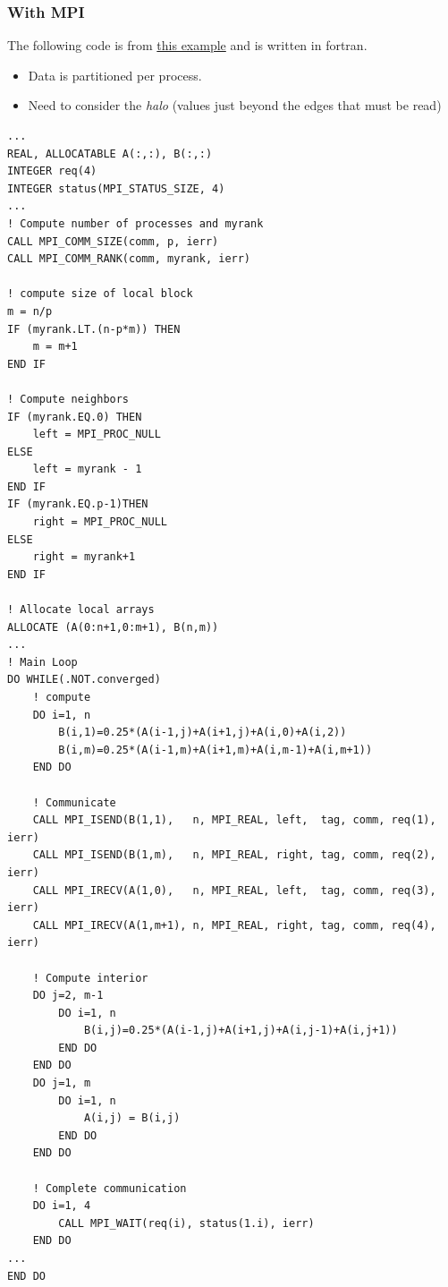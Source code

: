 \subsubsection{With MPI}
The following code is from \href{https://netlib.org/utk/papers/mpi-book/node51.html}{this example} and is written in fortran.
\begin{itemize}
    \item Data is partitioned per process.
    \item Need to consider the \textit{halo} (values just beyond the edges that must be read)
\end{itemize}
\begin{verbatim}
...
REAL, ALLOCATABLE A(:,:), B(:,:)
INTEGER req(4)
INTEGER status(MPI_STATUS_SIZE, 4)
...
! Compute number of processes and myrank
CALL MPI_COMM_SIZE(comm, p, ierr)
CALL MPI_COMM_RANK(comm, myrank, ierr)

! compute size of local block
m = n/p
IF (myrank.LT.(n-p*m)) THEN
    m = m+1
END IF

! Compute neighbors
IF (myrank.EQ.0) THEN
    left = MPI_PROC_NULL
ELSE
    left = myrank - 1
END IF
IF (myrank.EQ.p-1)THEN
    right = MPI_PROC_NULL
ELSE
    right = myrank+1
END IF

! Allocate local arrays
ALLOCATE (A(0:n+1,0:m+1), B(n,m))
...
! Main Loop
DO WHILE(.NOT.converged)
    ! compute
    DO i=1, n
        B(i,1)=0.25*(A(i-1,j)+A(i+1,j)+A(i,0)+A(i,2))
        B(i,m)=0.25*(A(i-1,m)+A(i+1,m)+A(i,m-1)+A(i,m+1))
    END DO

    ! Communicate
    CALL MPI_ISEND(B(1,1),   n, MPI_REAL, left,  tag, comm, req(1), ierr)
    CALL MPI_ISEND(B(1,m),   n, MPI_REAL, right, tag, comm, req(2), ierr)
    CALL MPI_IRECV(A(1,0),   n, MPI_REAL, left,  tag, comm, req(3), ierr)
    CALL MPI_IRECV(A(1,m+1), n, MPI_REAL, right, tag, comm, req(4), ierr)

    ! Compute interior
    DO j=2, m-1
        DO i=1, n
            B(i,j)=0.25*(A(i-1,j)+A(i+1,j)+A(i,j-1)+A(i,j+1))
        END DO
    END DO
    DO j=1, m
        DO i=1, n
            A(i,j) = B(i,j)
        END DO
    END DO

    ! Complete communication
    DO i=1, 4
        CALL MPI_WAIT(req(i), status(1.i), ierr)
    END DO
...
END DO
\end{verbatim}

